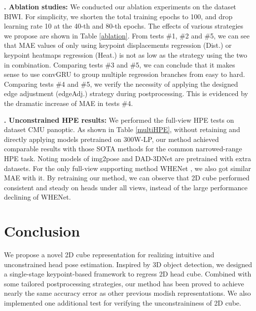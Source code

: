 \documentclass{article}
\begin{document}
{\bf {}. Ablation studies:}
We conducted our ablation experiments on the dataset BIWI. For simplicity, we shorten the total training epochs to 100, and drop learning rate 10 at the 40-th and 80-th epochs. The effects of various strategies we propose are shown in Table \ref{ablation}. From tests \#1, \#2 and \#5, we can see that MAE values of only using keypoint displacements regression (Dist.) or keypoint heatmaps regression (Heat.) is not as low as the strategy using the two in combination. Comparing tests \#3 and \#5, we can conclude that it makes sense to use convGRU to group multiple regression branches from easy to hard. Comparing tests \#4 and \#5, we verify the necessity of applying the designed edge adjustment (edgeAdj.) strategy during postprocessing. This is evidenced by the dramatic increase of MAE in tests \#4.

{\bf {}. Unconstrained HPE results:}
We performed the full-view HPE tests on dataset CMU panoptic. As shown in Table \ref{multiHPE}, without retaining and directly applying models pretrained on 300W-LP, our method achieved comparable results with those SOTA methods for the common narrowed-range HPE task. Noting models of img2pose \cite{albiero2021img2pose} and DAD-3DNet \cite{martyniuk2022dad} are pretrained with extra datasets. For the only full-view supporting method WHENet \cite{zhou2020whenet}, we also got similar MAE with it. By retraining our method, we can observe that 2D cube performed consistent and steady on heads under all views, instead of the large performance declining of WHENet.


\section{Conclusion}
We propose a novel 2D cube representation for realizing intuitive and unconstrained head pose estimation. Inspired by 3D object detection, we designed a single-stage keypoint-based framework to regress 2D head cube. Combined with some tailored postprocessing strategies, our method has been proved to achieve nearly the same accuracy error as other previous modish representations. We also implemented one additional test for verifying the unconstraininess of 2D cube. 



\vfill\pagebreak


\end{document}
